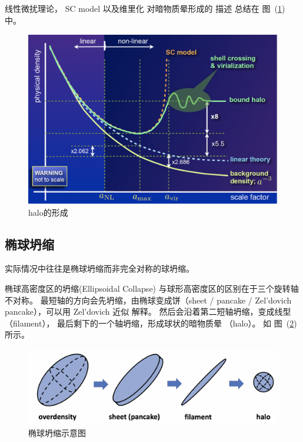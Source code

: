 \documentclass[12pt]{ctexart}
\newcommand{\reffig}[1]{图~(\ref{#1})}
\begin{document}
线性微扰理论， SC model 以及维里化 对暗物质晕形成的 描述 总结在 \reffig{fig:SC_model} 中。
\begin{figure}[!hbtp]
	\centering 
	\includegraphics[width=1.0\linewidth]{SC_model.png}
	\caption{halo的形成}
    \label{fig:SC_model}
\end{figure}



\subsection{椭球坍缩}
实际情况中往往是椭球坍缩而非完全对称的球坍缩。

椭球高密度区的坍缩(Ellipsoidal Collapse)
与球形高密度区的区别在于三个旋转轴不对称。
最短轴的方向会先坍缩，由椭球变成饼（sheet / pancake / Zel'dovich pancake），可以用 Zel'dovich 近似 解释。
然后会沿着第二短轴坍缩，变成线型 （filament），
最后剩下的一个轴坍缩，形成球状的暗物质晕 （halo）。 
如 \reffig{fig:Ellips_Colla} 所示。

\begin{figure}[!hbtp]
	\centering 
	\includegraphics[width=1.0\linewidth]{Ellips_Colla.png}
	\caption{椭球坍缩示意图}
    \label{fig:Ellips_Colla}
\end{figure}




\end{document}
